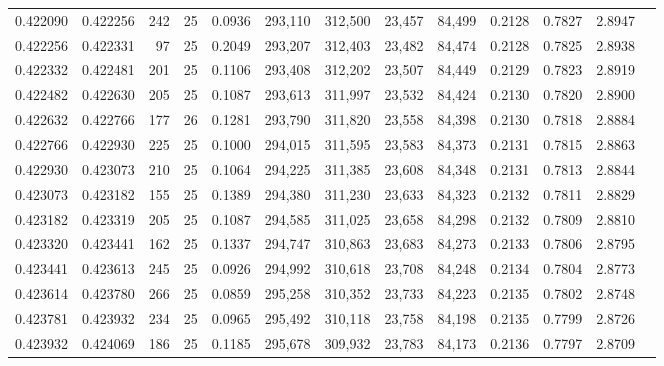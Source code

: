 \begin{tabular}{rrrrrrrrrrrrr}
0.422090 & 0.422256 &   242 &  25 &                                     0.0936 & 293,110 & 312,500 &  23,457 &  84,499 & 0.2128 & 0.7827 & 2.8947 \\
0.422256 & 0.422331 &    97 &  25 &                                     0.2049 & 293,207 & 312,403 &  23,482 &  84,474 & 0.2128 & 0.7825 & 2.8938 \\
0.422332 & 0.422481 &   201 &  25 &                                     0.1106 & 293,408 & 312,202 &  23,507 &  84,449 & 0.2129 & 0.7823 & 2.8919 \\
0.422482 & 0.422630 &   205 &  25 &                                     0.1087 & 293,613 & 311,997 &  23,532 &  84,424 & 0.2130 & 0.7820 & 2.8900 \\
0.422632 & 0.422766 &   177 &  26 &                                     0.1281 & 293,790 & 311,820 &  23,558 &  84,398 & 0.2130 & 0.7818 & 2.8884 \\
0.422766 & 0.422930 &   225 &  25 &                                     0.1000 & 294,015 & 311,595 &  23,583 &  84,373 & 0.2131 & 0.7815 & 2.8863 \\
0.422930 & 0.423073 &   210 &  25 &                                     0.1064 & 294,225 & 311,385 &  23,608 &  84,348 & 0.2131 & 0.7813 & 2.8844 \\
0.423073 & 0.423182 &   155 &  25 &                                     0.1389 & 294,380 & 311,230 &  23,633 &  84,323 & 0.2132 & 0.7811 & 2.8829 \\
0.423182 & 0.423319 &   205 &  25 &                                     0.1087 & 294,585 & 311,025 &  23,658 &  84,298 & 0.2132 & 0.7809 & 2.8810 \\
0.423320 & 0.423441 &   162 &  25 &                                     0.1337 & 294,747 & 310,863 &  23,683 &  84,273 & 0.2133 & 0.7806 & 2.8795 \\
0.423441 & 0.423613 &   245 &  25 &                                     0.0926 & 294,992 & 310,618 &  23,708 &  84,248 & 0.2134 & 0.7804 & 2.8773 \\
0.423614 & 0.423780 &   266 &  25 &                                     0.0859 & 295,258 & 310,352 &  23,733 &  84,223 & 0.2135 & 0.7802 & 2.8748 \\
0.423781 & 0.423932 &   234 &  25 &                                     0.0965 & 295,492 & 310,118 &  23,758 &  84,198 & 0.2135 & 0.7799 & 2.8726 \\
0.423932 & 0.424069 &   186 &  25 &                                     0.1185 & 295,678 & 309,932 &  23,783 &  84,173 & 0.2136 & 0.7797 & 2.8709 \\

\end{tabular}
